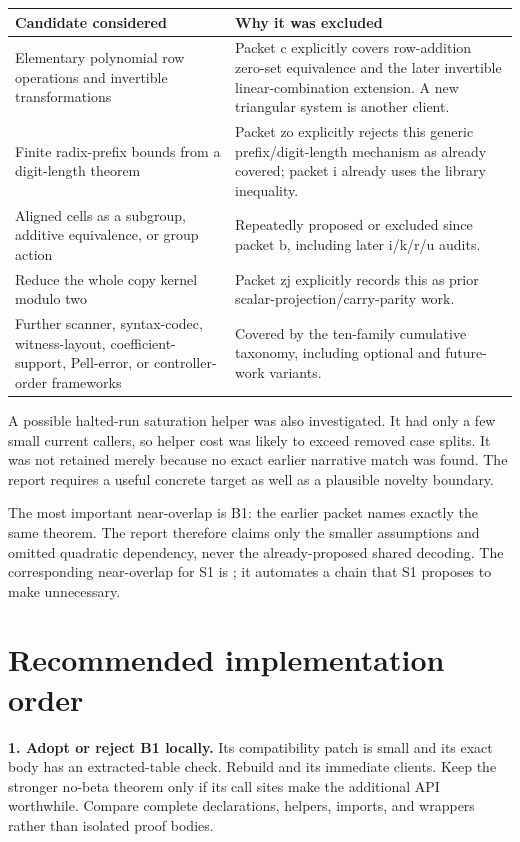 \documentclass[10pt,a4paper]{article}
\newcommand{\code}[1]{\texttt{\detokenize{#1}}}
\begin{document}
\begin{tabularx}{\linewidth}{@{}P{46mm}Y@{}}
\toprule
Candidate considered & Why it was excluded\\
\midrule
Elementary polynomial row operations and invertible transformations & Packet c explicitly covers row-addition zero-set equivalence and the later invertible linear-combination extension. A new triangular system is another client.\\
Finite radix-prefix bounds from a digit-length theorem & Packet zo explicitly rejects this generic prefix/digit-length mechanism as already covered; packet i already uses the library inequality.\\
Aligned cells as a subgroup, additive equivalence, or group action & Repeatedly proposed or excluded since packet b, including later i/k/r/u audits.\\
Reduce the whole copy kernel modulo two & Packet zj explicitly records this as prior scalar-projection/carry-parity work.\\
Further scanner, syntax-codec, witness-layout, coefficient-support, Pell-error, or controller-order frameworks & Covered by the ten-family cumulative taxonomy, including optional and future-work variants.\\
\bottomrule
\end{tabularx}

A possible halted-run saturation helper was also investigated. It had only a few small current callers, so helper cost was likely to exceed removed case splits. It was not retained merely because no exact earlier narrative match was found. The report requires a useful concrete target as well as a plausible novelty boundary.

The most important near-overlap is B1: the earlier packet names exactly the same theorem. The report therefore claims only the smaller assumptions and omitted quadratic dependency, never the already-proposed shared decoding. The corresponding near-overlap for S1 is \code{fun_prop}; it automates a chain that S1 proposes to make unnecessary.

\section{Recommended implementation order}

\textbf{1. Adopt or reject B1 locally.} Its compatibility patch is small and its exact body has an extracted-table check. Rebuild \code{NativePellBootstrap} and its immediate clients. Keep the stronger no-beta theorem only if its call sites make the additional API worthwhile. Compare complete declarations, helpers, imports, and wrappers rather than isolated proof bodies.
\end{document}
